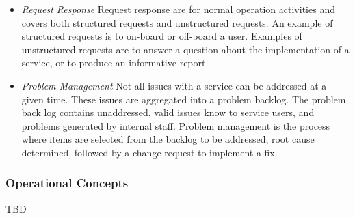 \begin{enumerate}
\begin{itemize}
  \item \emph{Request Response} Request response are for normal operation activities and covers both structured
  requests and unstructured
  requests.  An example of structured requests is to on-board or
  off-board a user. Examples of unstructured requests are to answer a
  question about the implementation of a service, or to produce an
  informative report. 

  \item \emph{Problem Management} Not all issues with a service can be
  addressed at a given time. These issues are aggregated into a problem
  backlog. The problem back log contains unaddressed, valid issues
  know to service users, and problems generated by internal staff.
  Problem management is the process where items are selected from the
  backlog to be addressed, root cause determined, followed by a change
  request to implement a fix.

  \end{itemize}

\end{enumerate}
\subsubsection{Operational Concepts}
TBD


